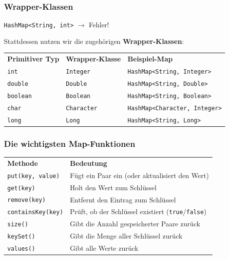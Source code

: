 \documentclass{../../presentation}
\begin{document}
\begin{frame}[fragile]
	\frametitle{Wrapper-Klassen}
	\fehler \texttt{HashMap<String, int>} $\to$ \alert{Fehler!}

	\vspace{0.8em}
	Stattdessen nutzen wir die zugehörigen \textbf{Wrapper-Klassen}:

	\pause
	\vspace{0.4em}
	\begin{center}
		\begin{tabular}{l l l}
			\rowcolor{tablehead}
			\textbf{Primitiver Typ} & \textbf{Wrapper-Klasse} & \textbf{Beispiel-Map}                \\
			\texttt{int}            & \texttt{Integer}        & \texttt{HashMap<String, Integer>}    \\
			\texttt{double}         & \texttt{Double}         & \texttt{HashMap<String, Double>}     \\
			\texttt{boolean}        & \texttt{Boolean}        & \texttt{HashMap<String, Boolean>}    \\
			\texttt{char}           & \texttt{Character}      & \texttt{HashMap<Character, Integer>} \\
			\texttt{long}           & \texttt{Long}           & \texttt{HashMap<String, Long>}       \\
		\end{tabular}
	\end{center}
\end{frame}

\begin{frame}
	\frametitle{Die wichtigsten Map-Funktionen}
	\begin{table}[h]
		\centering
		\begin{tabular}{l l}
			\rowcolor{tablehead}
			\textbf{Methode}          & \textbf{Bedeutung}                                               \\
			\texttt{put(key, value)}  & Fügt ein Paar ein (oder aktualisiert den Wert)                   \\
			\texttt{get(key)}         & Holt den Wert zum Schlüssel                                      \\
			\texttt{remove(key)}      & Entfernt den Eintrag zum Schlüssel                               \\
			\texttt{containsKey(key)} & Prüft, ob der Schlüssel existiert (\texttt{true}/\texttt{false}) \\
			\texttt{size()}           & Gibt die Anzahl gespeicherter Paare zurück                       \\
			\texttt{keySet()}         & Gibt die Menge aller Schlüssel zurück                            \\
			\texttt{values()}         & Gibt alle Werte zurück                                           \\
		\end{tabular}
	\end{table}
\end{frame}
\end{document}
